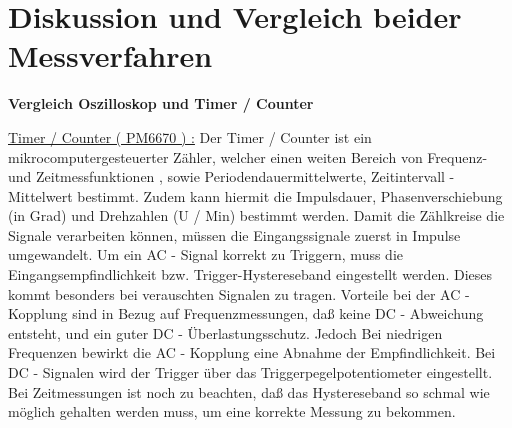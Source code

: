 \documentclass[footsepline,11pt,oneside,a4paper]{scrartcl}
\begin{document}
\newline
\newpage
\newline
\newline
\bigskip
\bigskip
\begin{center}
\end{center}
\newline
\newline
\bigskip
\newline
\newline
\begin{center}
\end{center}
\newpage
\section{Diskussion und Vergleich beider Messverfahren}
\begin{center}
\textbf{Vergleich Oszilloskop und Timer / Counter }
\end{center}
\newline
\newline
\underline{Timer / Counter ( PM6670 ) :}
\newline
\newline
Der Timer / Counter ist ein mikrocomputergesteuerter Zähler, welcher einen weiten Bereich von Frequenz- und Zeitmessfunktionen , sowie Periodendauermittelwerte, Zeitintervall - Mittelwert bestimmt. Zudem kann hiermit die Impulsdauer, Phasenverschiebung (in Grad) und Drehzahlen (U / Min) bestimmt werden.
\newline
Damit die Zählkreise die Signale verarbeiten können, müssen die Eingangssignale zuerst in Impulse umgewandelt. Um ein AC - Signal korrekt zu Triggern, muss die Eingangsempfindlichkeit bzw. Trigger-Hystereseband eingestellt werden. Dieses kommt besonders bei verauschten Signalen zu tragen. 
\newline
Vorteile bei der AC - Kopplung sind in Bezug auf Frequenzmessungen, daß keine DC - Abweichung entsteht, und ein guter DC - Überlastungsschutz. Jedoch Bei niedrigen Frequenzen bewirkt die AC - Kopplung eine Abnahme der Empfindlichkeit.
\newline 
Bei DC - Signalen wird der Trigger über das Triggerpegelpotentiometer eingestellt. 
\newline
Bei Zeitmessungen ist noch zu beachten, daß das Hystereseband so schmal wie möglich gehalten werden muss, um eine korrekte Messung zu bekommen.
\end{document}
